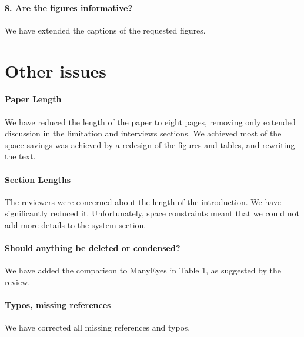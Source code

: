 \documentclass{article}
\begin{document}
\paragraph*{8. Are the figures informative?}
We have extended the captions of the requested figures.

\section*{Other issues}

\paragraph*{Paper Length} We have reduced the length of the paper
to eight pages, removing only extended discussion in the limitation
and interviews sections. We achieved most of the space savings was
achieved by a redesign of the figures and tables, and rewriting the
text.

\paragraph*{Section Lengths} The reviewers were concerned about the length
of the introduction. We have significantly reduced it. Unfortunately,
space constraints meant that we could not add more details to the
system section.

\paragraph*{Should anything be deleted or condensed?}
We have added the comparison to ManyEyes in Table 1, as suggested by the review.

\paragraph*{Typos, missing references} We have corrected all missing references and typos.
\end{document}
